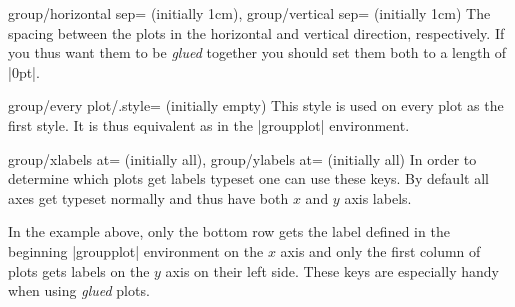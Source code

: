 {\begin{pgfplotskeylist}{%
    group/horizontal sep= (initially 1cm),
    group/vertical sep= (initially 1cm)%
}
    The spacing between the plots in the horizontal and vertical direction,
    respectively. If you thus want them to be \textit{glued} together you
    should set them both to a length of |0pt|.
\end{pgfplotskeylist}

\begin{pgfplotskey}{group/every plot/.style= (initially empty)}
    This style is used on every plot as the first style. It is thus equivalent
    as  in the |groupplot| environment.
\end{pgfplotskey}

\begin{pgfplotskeylist}{%
    group/xlabels at= (initially all),
    group/ylabels at= (initially all)%
}
    In order to determine which plots get labels typeset one can use these
    keys. By default all axes get typeset normally and thus have both $x$ and
    $y$ axis labels.
\begin{codeexample}[]
\end{codeexample}
    In the example above, only the bottom row gets the label defined in the
    beginning |groupplot| environment on the $x$ axis and only the first column
    of plots gets labels on the $y$ axis on their left side. These keys are
    especially handy when using \textit{glued} plots.
\end{pgfplotskeylist}

}
